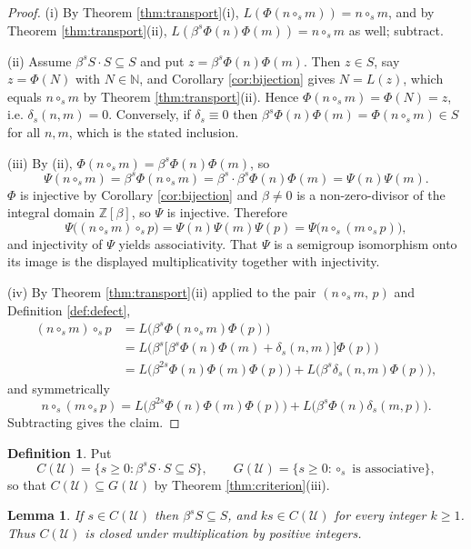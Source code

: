 \documentclass[11pt,reqno]{amsart}
\theoremstyle{plain}
\newtheorem{lemma}[theorem]{Lemma}
\theoremstyle{definition}
\newtheorem{definition}[theorem]{Definition}
\newcommand{\Z}{\mathbb{Z}}
\newcommand{\N}{\mathbb{N}}
\newcommand{\Uu}{\mathcal{U}}
\begin{document}
\begin{proof}
(i) By Theorem \ref{thm:transport}(i), $L(\Phi(n\circ_{s}m))=n\circ_{s}m$, and by
Theorem \ref{thm:transport}(ii), $L(\beta^{s}\Phi(n)\Phi(m))=n\circ_{s}m$ as well; subtract.

(ii) Assume $\beta^{s}S\cdot S\subseteq S$ and put $z=\beta^{s}\Phi(n)\Phi(m)$. Then $z\in S$, say
$z=\Phi(N)$ with $N\in\N$, and Corollary \ref{cor:bijection} gives $N=L(z)$, which equals
$n\circ_{s}m$ by Theorem \ref{thm:transport}(ii). Hence $\Phi(n\circ_{s}m)=\Phi(N)=z$, i.e.
$\delta_{s}(n,m)=0$. Conversely, if $\delta_{s}\equiv0$ then
$\beta^{s}\Phi(n)\Phi(m)=\Phi(n\circ_{s}m)\in S$ for all $n,m$, which is the stated inclusion.

(iii) By (ii), $\Phi(n\circ_{s}m)=\beta^{s}\Phi(n)\Phi(m)$, so
\[
  \Psi(n\circ_{s}m)=\beta^{s}\Phi(n\circ_{s}m)=\beta^{s}\cdot\beta^{s}\Phi(n)\Phi(m)=\Psi(n)\Psi(m).
\]
$\Phi$ is injective by Corollary \ref{cor:bijection} and $\beta\ne0$ is a non-zero-divisor of the
integral domain $\Z[\beta]$, so $\Psi$ is injective. Therefore
\[
  \Psi\bigl((n\circ_{s}m)\circ_{s}p\bigr)=\Psi(n)\Psi(m)\Psi(p)
  =\Psi\bigl(n\circ_{s}(m\circ_{s}p)\bigr),
\]
and injectivity of $\Psi$ yields associativity. That $\Psi$ is a semigroup isomorphism onto its
image is the displayed multiplicativity together with injectivity.

(iv) By Theorem \ref{thm:transport}(ii) applied to the pair $(n\circ_{s}m,\,p)$ and
Definition \ref{def:defect},
\begin{align*}
  (n\circ_{s}m)\circ_{s}p
  &=L\bigl(\beta^{s}\Phi(n\circ_{s}m)\Phi(p)\bigr)\\
  &=L\bigl(\beta^{s}\bigl[\beta^{s}\Phi(n)\Phi(m)+\delta_{s}(n,m)\bigr]\Phi(p)\bigr)\\
  &=L\bigl(\beta^{2s}\Phi(n)\Phi(m)\Phi(p)\bigr)+L\bigl(\beta^{s}\delta_{s}(n,m)\Phi(p)\bigr),
\end{align*}
and symmetrically
\[
  n\circ_{s}(m\circ_{s}p)
  =L\bigl(\beta^{2s}\Phi(n)\Phi(m)\Phi(p)\bigr)+L\bigl(\beta^{s}\Phi(n)\delta_{s}(m,p)\bigr).
\]
Subtracting gives the claim.
\end{proof}

\begin{definition}\label{def:sets}
Put
\[
  C(\Uu)=\{s\ge0:\beta^{s}S\cdot S\subseteq S\},\qquad
  G(\Uu)=\{s\ge0:\circ_{s}\text{ is associative}\},
\]
so that $C(\Uu)\subseteq G(\Uu)$ by Theorem \ref{thm:criterion}(iii).
\end{definition}

\begin{lemma}\label{lem:multiples}
If $s\in C(\Uu)$ then $\beta^{s}S\subseteq S$, and $ks\in C(\Uu)$ for every integer $k\ge1$. Thus
$C(\Uu)$ is closed under multiplication by positive integers.
\end{lemma}
\end{document}
